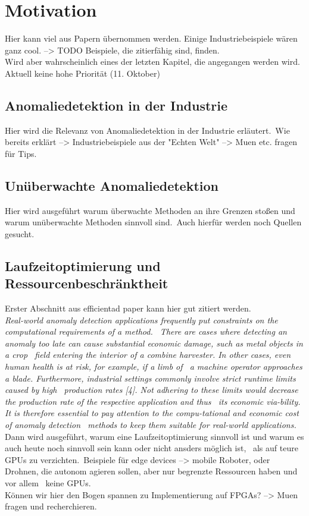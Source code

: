 
\chapter{Motivation}\label{ch:Motivation}
Hier kann viel aus Papern übernommen werden. Einige Industriebeispiele wären ganz cool. --> TODO Beispiele, die zitierfähig sind, finden.\\
Wird aber wahrscheinlich eines der letzten Kapitel, die angegangen werden wird. Aktuell keine hohe Priorität (11. Oktober)\\
\section{Anomaliedetektion in der Industrie}\label{sec:AnomaliedetektionIndustrie}
Hier wird die Relevanz von Anomaliedetektion in der Industrie erläutert.\
Wie bereits erklärt --> Industriebeispiele aus der "Echten Welt" --> Muen etc. fragen für Tips.\
\section{Unüberwachte Anomaliedetektion}\label{sec:UnueberwachteAnomaliedetektion}
Hier wird ausgeführt warum überwachte Methoden an ihre Grenzen stoßen und warum unüberwachte Methoden sinnvoll sind.\
Auch hierfür werden noch Quellen gesucht.\
\section{Laufzeitoptimierung und Ressourcenbeschränktheit}\label{sec:Laufzeitoptimierung}
Erster Abschnitt aus efficientad paper kann hier gut zitiert werden.\\
\textit{Real-world anomaly detection applications frequently put constraints on the computational requirements of a method. \ 
There are cases where detecting an anomaly too late can cause substantial economic damage, such as metal objects in a crop \ 
field entering the interior of a combine harvester. In other cases, even human health is at risk, for example, if a limb of \ 
a machine operator approaches a blade. Furthermore, industrial settings commonly involve strict runtime limits caused by high \ 
production rates [4]. Not adhering to these limits would decrease the production rate of the respective application and thus \ 
its economic via-bility. It is therefore essential to pay attention to the compu-tational and economic cost of anomaly detection \ 
methods to keep them suitable for real-world applications.}
Dann wird ausgeführt, warum eine Laufzeitoptimierung sinnvoll ist und warum es auch heute noch sinnvoll sein kann oder nicht ansders möglich ist, \ 
als auf teure GPUs zu verzichten.\
Beispiele für edge devices --> mobile Roboter, oder Drohnen, die autonom agieren sollen, aber nur begrenzte Ressourcen haben und vor allem \
keine GPUs.\\
Können wir hier den Bogen spannen zu Implementierung auf FPGAs? --> Muen fragen und recherchieren.